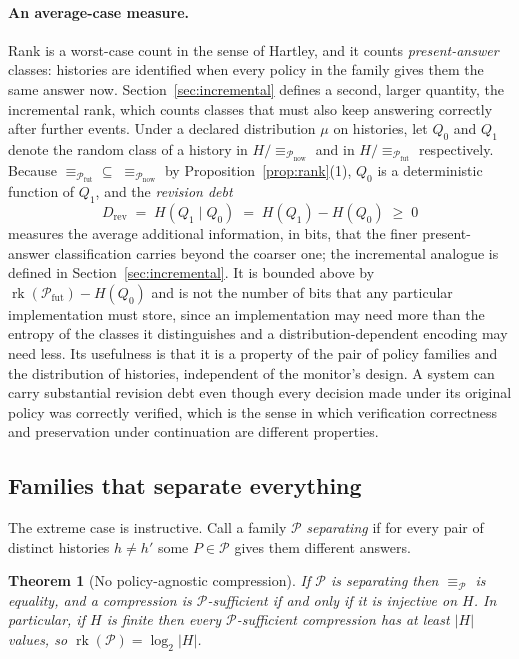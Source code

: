 \documentclass[11pt]{article}
\newtheorem{theorem}{Theorem}
\theoremstyle{definition}
\theoremstyle{remark}
\newcommand{\Hist}{H}
\newcommand{\Pol}{\mathcal{P}}
\newcommand{\Fut}{\mathcal{P}_{\mathrm{fut}}}
\newcommand{\Now}{\mathcal{P}_{\mathrm{now}}}
\newcommand{\eqv}[1]{\equiv_{#1}}
\newcommand{\rank}{\operatorname{rk}}
\begin{document}
\paragraph{An average-case measure.}
Rank is a worst-case count in the sense of Hartley, and it counts \emph{present-answer} classes: histories are identified when every policy in the family gives them the same answer now. Section~\ref{sec:incremental} defines a second, larger quantity, the incremental rank, which counts classes that must also keep answering correctly after further events. Under a declared distribution $\mu$ on histories, let $Q_0$ and $Q_1$ denote the random class of a history in $\Hist/{\eqv{\Now}}$ and in $\Hist/{\eqv{\Fut}}$ respectively. Because $\eqv{\Fut}\subseteq\;\eqv{\Now}$ by Proposition~\ref{prop:rank}(1), $Q_0$ is a deterministic function of $Q_1$, and the \emph{revision debt}
\[
D_{\mathrm{rev}}\;=\;H(Q_1\mid Q_0)\;=\;H(Q_1)-H(Q_0)\;\ge\;0
\]
measures the average additional information, in bits, that the finer present-answer classification carries beyond the coarser one; the incremental analogue is defined in Section~\ref{sec:incremental}. It is bounded above by $\rank(\Fut)-H(Q_0)$ and is not the number of bits that any particular implementation must store, since an implementation may need more than the entropy of the classes it distinguishes and a distribution-dependent encoding may need less. Its usefulness is that it is a property of the pair of policy families and the distribution of histories, independent of the monitor's design. A system can carry substantial revision debt even though every decision made under its original policy was correctly verified, which is the sense in which verification correctness and preservation under continuation are different properties.

\subsection{Families that separate everything}

The extreme case is instructive. Call a family $\Pol$ \emph{separating} if for every pair of distinct histories $h\ne h'$ some $P\in\Pol$ gives them different answers.

\begin{theorem}[No policy-agnostic compression]\label{thm:inject}
If $\Pol$ is separating then $\eqv{\Pol}$ is equality, and a compression is $\Pol$-sufficient if and only if it is injective on $\Hist$. In particular, if $\Hist$ is finite then every $\Pol$-sufficient compression has at least $|\Hist|$ values, so $\rank(\Pol)=\log_2|\Hist|$.
\end{theorem}
\end{document}
